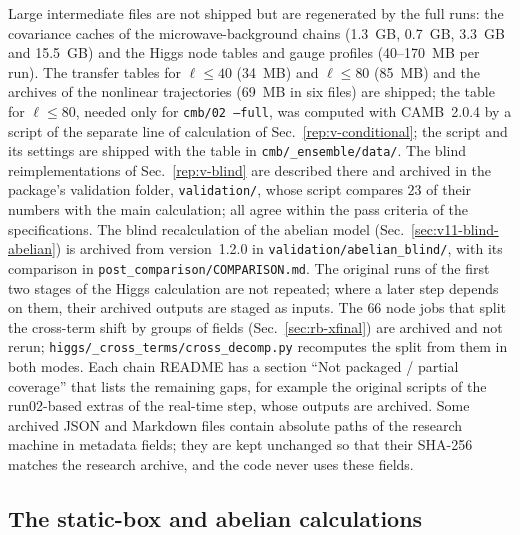 Large intermediate files are not shipped but are regenerated by the full runs: the covariance caches of the microwave-background chains (1.3~GB, 0.7~GB, 3.3~GB and 15.5~GB) and the Higgs node tables and gauge profiles (40--170~MB per run).
The transfer tables for $\ell\le40$ (34~MB) and $\ell\le80$ (85~MB) and the archives of the nonlinear trajectories (69~MB in six files) are shipped; the table for $\ell\le80$, needed only for \texttt{cmb/02 --full}, was computed with CAMB~2.0.4 by a script of the separate line of calculation of Sec.~\ref{rep:v-conditional}; the script and its settings are shipped with the table in \texttt{cmb/\_ensemble/\allowbreak data/}. %
The blind reimplementations of Sec.~\ref{rep:v-blind} are described there and archived in the package's validation folder, \texttt{validation/}, whose script compares $23$ of their numbers with the main calculation; all agree within the pass criteria of the specifications. The blind recalculation of the abelian model (Sec.~\ref{sec:v11-blind-abelian}) is archived from version~1.2.0 in \texttt{validation/\allowbreak abelian\_blind/}, with its comparison in \texttt{post\_comparison/\allowbreak COMPARISON.md}. %
The original runs of the first two stages of the Higgs calculation are not repeated; where a later step depends on them, their archived outputs are staged as inputs.
The $66$ node jobs that split the cross-term shift by groups of fields (Sec.~\ref{sec:rb-xfinal}) are archived and not rerun; \texttt{higgs/\_cross\_terms/\allowbreak cross\_decomp.py} recomputes the split from them in both modes. %
Each chain README has a section ``Not packaged / partial coverage'' that lists the remaining gaps, for example the original scripts of the run02-based extras of the real-time step, whose outputs are archived.
Some archived JSON and Markdown files contain absolute paths of the research machine in metadata fields; they are kept unchanged so that their SHA-256 matches the research archive, and the code never uses these fields.

\subsection{The static-box and abelian calculations}\label{sec:v11-repro-supplement}

